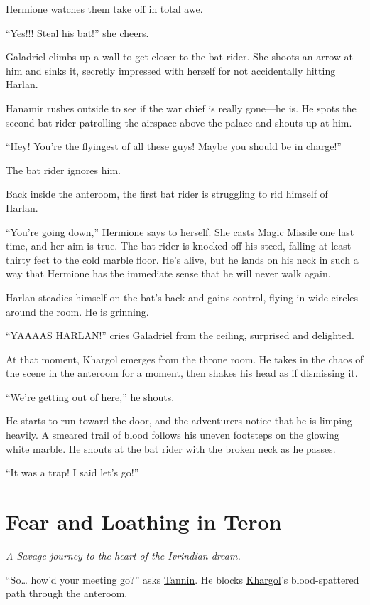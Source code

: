 \documentclass[smalldemyvopaper,11pt,twoside,onecolumn,openright,extrafontsizes]{memoir}
\newcommand{\chapdesc}[1]{
    \begin{flushright}
    \emph{{#1}}
    \end{flushright}
    \vspace{26pt}
}
\begin{document}
Hermione watches them take off in total awe.

``Yes!!! Steal his bat!'' she cheers.

Galadriel climbs up a wall to get closer to the bat rider. She shoots an
arrow at him and sinks it, secretly impressed with herself for not
accidentally hitting Harlan.

Hanamir rushes outside to see if the war chief is really gone---he is.
He spots the second bat rider patrolling the airspace above the palace
and shouts up at him.

``Hey! You're the flyingest of all these guys! Maybe you should be in
charge!''

The bat rider ignores him.

Back inside the anteroom, the first bat rider is struggling to rid
himself of Harlan.

``You're going down,'' Hermione says to herself. She casts Magic Missile
one last time, and her aim is true. The bat rider is knocked off his
steed, falling at least thirty feet to the cold marble floor. He's
alive, but he lands on his neck in such a way that Hermione has the
immediate sense that he will never walk again.

Harlan steadies himself on the bat's back and gains control, flying in
wide circles around the room. He is grinning.

``YAAAAS HARLAN!'' cries Galadriel from the ceiling, surprised and
delighted.

At that moment, Khargol emerges from the throne room. He takes in the
chaos of the scene in the anteroom for a moment, then shakes his head as
if dismissing it.

``We're getting out of here,'' he shouts.

He starts to run toward the door, and the adventurers notice that he is
limping heavily. A smeared trail of blood follows his uneven footsteps
on the glowing white marble. He shouts at the bat rider with the broken
neck as he passes.

``It was a trap! I said let's go!''


\chapter{Fear and Loathing in Teron}
\chapdesc{A Savage journey to the heart of the Ivrindian dream.}

``So\ldots{} how'd your meeting go?'' asks
\href{/characters/tannin/}{Tannin}. He blocks
\href{/characters/khargol/}{Khargol}'s blood-spattered path through the
anteroom.
\end{document}
